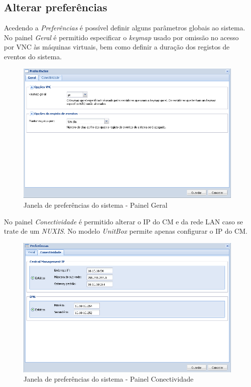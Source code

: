 \subsection{Alterar preferências}
Acedendo a \emph{Preferências} é possível definir alguns parâmetros globais ao sistema.
No painel \emph{Geral} é permitido especificar o \emph{keymap} usado por omissão no acesso por VNC às máquinas virtuais, bem como definir a duração dos registos de eventos do sistema.

\begin{figure}[H]
        \begin{center}
        \includegraphics[scale=0.5]{screenshots/preferences_general.png}
        \caption{Janela de preferências do sistema - Painel Geral}
        \label{fig:preferences_general}
        \end{center}
\end{figure}

No painel \emph{Conectividade} é permitido alterar o IP do CM e da rede LAN caso se trate de um \emph{NUXIS}. No modelo \emph{UnitBox} permite apenas configurar o IP do CM.

\begin{figure}[H]
        \begin{center}
        \includegraphics[scale=0.5]{screenshots/preferences_conn.png}
        \caption{Janela de preferências do sistema - Painel Conectividade}
        \label{fig:preferences_conn}
        \end{center}
\end{figure}

